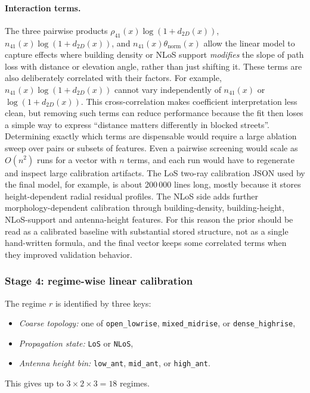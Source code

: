\paragraph{Interaction terms.}
The three pairwise products
$\rho_{41}(x)\log(1+d_{2D}(x))$,
$n_{41}(x)\log(1+d_{2D}(x))$, and
$n_{41}(x)\theta_{\mathrm{norm}}(x)$
allow the linear model to capture effects where building density or NLoS
support \emph{modifies} the slope of path loss with distance or elevation
angle, rather than just shifting it.
These terms are also deliberately correlated with their factors. For example,
$n_{41}(x)\log(1+d_{2D}(x))$ cannot vary independently of $n_{41}(x)$ or
$\log(1+d_{2D}(x))$. This cross-correlation makes coefficient interpretation
less clean, but removing such terms can reduce performance because the fit then
loses a simple way to express ``distance matters differently in blocked
streets''. Determining exactly which terms are dispensable would require a
large ablation sweep over pairs or subsets of features. Even a pairwise
screening would scale as $O(n^2)$ runs for a vector with $n$ terms, and each
run would have to regenerate and inspect large calibration artifacts. The LoS
two-ray calibration JSON used by the final model, for example, is about
200\,000 lines long, mostly because it stores height-dependent radial residual
profiles. The NLoS side adds further morphology-dependent calibration through
building-density, building-height, NLoS-support and antenna-height features.
For this reason the prior should be read as a calibrated baseline with substantial
stored structure, not as a single hand-written formula, and the final vector
keeps some correlated terms when they improved validation behavior.

\subsubsection{Stage 4: regime-wise linear calibration}

The regime $r$ is identified by three keys:
\begin{itemize}
\item \emph{Coarse topology:} one of \texttt{open\_lowrise},
      \texttt{mixed\_midrise}, or \texttt{dense\_highrise},
\item \emph{Propagation state:} \texttt{LoS} or \texttt{NLoS},
\item \emph{Antenna height bin:} \texttt{low\_ant}, \texttt{mid\_ant}, or
      \texttt{high\_ant}.
\end{itemize}
This gives up to $3 \times 2 \times 3 = 18$ regimes.

